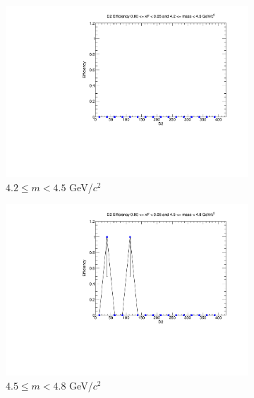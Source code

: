 \begin{figure}[p]
    \centering
    \begin{subfigure}[b]{0.32\textwidth}
        \centering
        \includegraphics[width=\textwidth]{./kTrackerEfficiencyPlots/D2_Efficiency_xF0_mass0.pdf}
        \caption{$4.2 \leq m < 4.5$ GeV/$c^2$}
        \label{fig:xF0_mass0}
    \end{subfigure}
    \hfill
    \begin{subfigure}[b]{0.32\textwidth}
        \centering
        \includegraphics[width=\textwidth]{./kTrackerEfficiencyPlots/D2_Efficiency_xF0_mass1.pdf}
        \caption{$4.5 \leq m < 4.8$ GeV/$c^2$}
        \label{fig:xF0_mass1}
    \end{subfigure}
    \hfill
    \begin{subfigure}[b]{0.32\textwidth}

\end{subfigure}
\end{figure}
